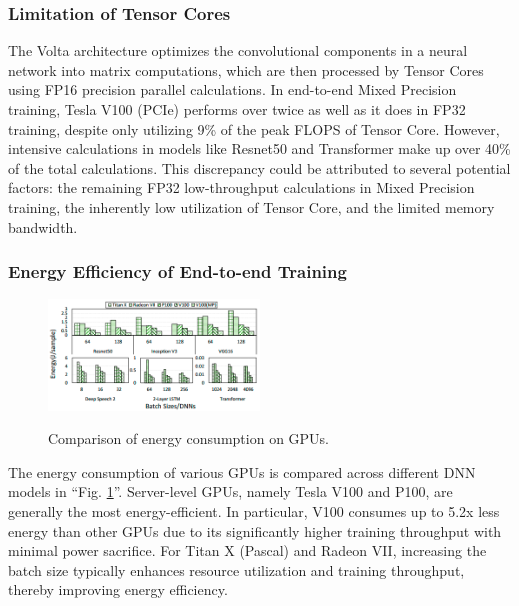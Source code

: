 \subsubsection{Limitation of Tensor Cores}
The Volta architecture optimizes the convolutional components in a neural network into matrix computations, which are then processed by Tensor Cores using FP16 precision parallel calculations.
In end-to-end Mixed Precision training, Tesla V100 (PCIe) performs over twice as well as it does in FP32 training, despite only utilizing 9\% of the peak FLOPS of Tensor Core.
However, intensive calculations in models like Resnet50 and Transformer make up over 40\% of the total calculations.
This discrepancy could be attributed to several potential factors: the remaining FP32 low-throughput calculations in Mixed Precision training, the inherently low utilization of Tensor Core, and the limited memory bandwidth.

\subsubsection{Energy Efficiency of End-to-end Training}
\begin{figure}[htbp!]
    \centering
    {    \includegraphics[width=0.5\textwidth]{images/energycomp}}
    \caption{Comparison of energy consumption on GPUs.}
    \label{fig:energycomp}
\end{figure}

The energy consumption of various GPUs is compared across different DNN models in ``Fig. \ref{fig:energycomp}''.
Server-level GPUs, namely Tesla V100 and P100, are generally the most energy-efficient.
\newpage In particular, V100 consumes up to 5.2x less energy than other GPUs due to its significantly higher training throughput with minimal power sacrifice.
For Titan X (Pascal) and Radeon VII, increasing the batch size typically enhances resource utilization and training throughput, thereby improving energy efficiency.
